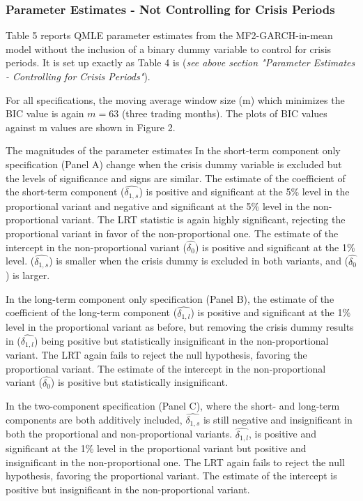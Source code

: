 \documentclass[12pt]{article}
\begin{document}
\subsubsection{Parameter Estimates - Not Controlling for Crisis Periods}
Table 5 reports QMLE parameter estimates from the MF2-GARCH-in-mean model without the inclusion of a binary dummy variable to control for crisis periods. It is set up exactly as Table 4 is (\textit{see above section "Parameter Estimates - Controlling for Crisis Periods"}).\par
For all specifications, the moving average window size (m) which minimizes the BIC value is again $m=63$ (three trading months). The plots of BIC values against m values are shown in Figure 2.\par
The magnitudes of the parameter estimates In the short-term component only specification (Panel A) change when the crisis dummy variable is excluded but the levels of significance and signs are similar. The estimate of the coefficient of the short-term component ($\widehat{\delta_{1,s}}$) is positive and significant at the 5\% level in the proportional variant and negative and significant at the 5\% level in the non-proportional variant. The LRT statistic is again highly significant, rejecting the proportional variant in favor of the non-proportional one. The estimate of the intercept in the non-proportional variant ($\widehat{\delta_0}$) is positive and significant at the 1\% level. ($\widehat{\delta_{1,s}}$) is smaller when the crisis dummy is excluded in both variants, and ($\widehat{\delta_0}$) is larger.\par
In the long-term component only specification (Panel B), the estimate of the coefficient of the long-term component ($\widehat{\delta_{1,l}}$) is positive and significant at the 1\% level in the proportional variant as before, but removing the crisis dummy results in ($\widehat{\delta_{1,l}}$) being positive but statistically insignificant in the non-proportional variant.  The LRT again fails to reject the null hypothesis, favoring the proportional variant. The estimate of the intercept in the non-proportional variant ($\widehat{\delta_0}$) is positive but statistically insignificant.\par
In the two-component specification (Panel C), where the short- and long-term components are both additively included, $\widehat{\delta_{1,s}}$ is still negative and insignificant in both the proportional and non-proportional variants. $\widehat{\delta_{1,l}}$, is positive and significant at the 1\% level in the proportional variant but positive and insignificant in the non-proportional one. The LRT again fails to reject the null hypothesis, favoring the proportional variant. The estimate of the intercept is positive but insignificant in the non-proportional variant.\par
\end{document}
